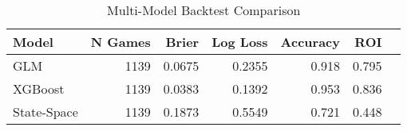\begin{table}[htbp]
\centering
\caption{Multi-Model Backtest Comparison}
\label{tab:multimodel}
\begin{tabular}{lrrrrrr}
\toprule
Model & N Games & Brier & Log Loss & Accuracy & ROI \\
\midrule
GLM & 1139 & 0.0675 & 0.2355 & 0.918 & 0.795 \\
XGBoost & 1139 & 0.0383 & 0.1392 & 0.953 & 0.836 \\
State-Space & 1139 & 0.1873 & 0.5549 & 0.721 & 0.448 \\
\bottomrule
\end{tabular}
\end{table}
